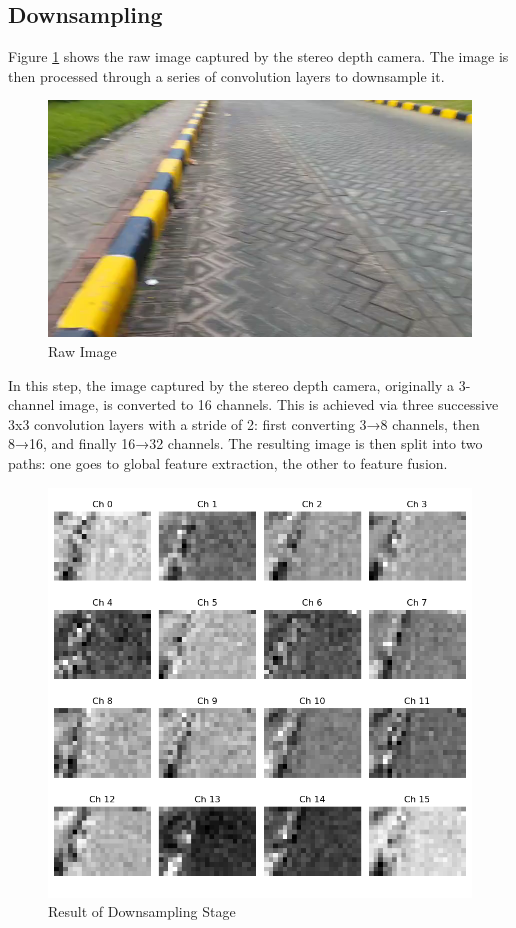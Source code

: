 \subsection{Downsampling} 
Figure \ref{fig:ml_capture} shows the raw image captured by the stereo depth camera. The image is then processed through a series of convolution layers to downsample it.
\begin{figure}[H]
	\centering
	\includegraphics[width=\linewidth]{../konten/asli.png}
	\caption{Raw Image}
	\label{fig:ml_capture}
\end{figure} 
In this step, the image captured by the stereo depth camera, originally a 3-channel image, is converted to 16 channels. This is achieved via three successive 3x3 convolution layers with a stride of 2: first converting 3→8 channels, then 8→16, and finally 16→32 channels. The resulting image is then split into two paths: one goes to global feature extraction, the other to feature fusion. 
\begin{figure}[H]
	\centering
	\includegraphics[width=\linewidth]{../konten/ds_b3.png}
	\caption{Result of Downsampling Stage}
	\label{fig:ml_ds}
\end{figure} 
